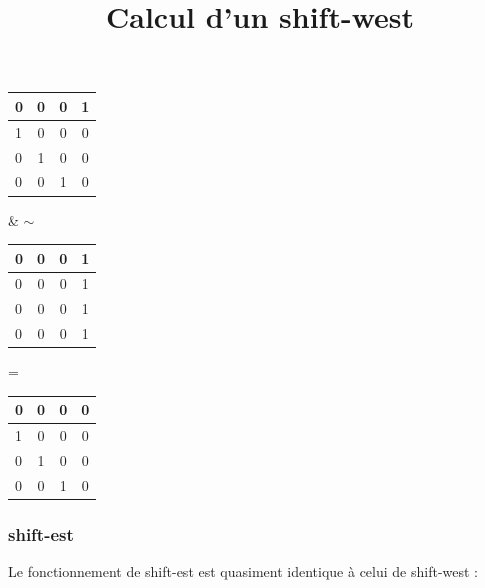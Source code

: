 \documentclass{report}
\begin{document}
\begin{center}
\renewcommand{\arraystretch} {1.5}
    \begin{tabular}{|p{0.2cm}|c|c|c|}
        \hline
        0 & 0 & 0 & 1\\
        \hline
        1 & 0 & 0 & 0 \\
        \hline
        0 & 1 & 0 & 0 \\
        \hline
        0 & 0 & 1 & 0 \\
        \hline
    \end{tabular}
    \& $\sim$
    \begin{tabular}{|p{0.2cm}|c|c|c|}
        \hline
        0 & 0 & 0 & 1\\
        \hline
        0 & 0 & 0 & 1 \\
        \hline
        0 & 0 & 0 & 1 \\
        \hline
        0 & 0 & 0 & 1 \\
        \hline
    \end{tabular}
    =
     \begin{tabular}{|p{0.2cm}|c|c|c|}
        \hline
        0 & 0 & 0 & 0\\
        \hline
        1 & 0 & 0 & 0 \\
        \hline
        0 & 1 & 0 & 0 \\
        \hline
        0 & 0 & 1 & 0 \\
        \hline
    \end{tabular}

\end{center}
\begin{center}
        \title{Calcul d'un shift-west}
\end{center}

\subsubsection{shift-est}

Le fonctionnement de shift-est est quasiment identique à celui de shift-west :
\end{document}
